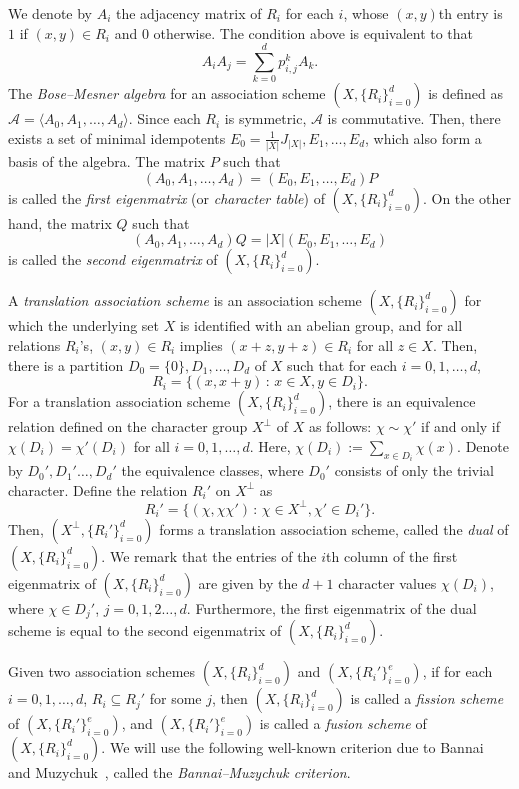 \documentclass[10pt]{amsart}
\theoremstyle{definition}
\begin{document}
We denote by $A_i$ the adjacency matrix of $R_i$ for each $i$, whose $(x,y)$th entry is $1$ if $(x,y)\in R_i$ and $0$ otherwise. The condition above is equivalent to that
\[
A_iA_j=\sum_{k=0}^d p_{i,j}^k A_k.
\]
The \emph{Bose--Mesner algebra} for an association scheme $(X,\{R_i\}_{i=0}^d)$ is defined as ${\mathcal A}=\langle A_0,A_1,\ldots,A_d\rangle$. Since each $R_i$ is symmetric, ${\mathcal A}$ is commutative. Then, there exists a set of minimal idempotents $E_0=\frac{1}{|X|}J_{|X|},E_1,\ldots,E_d$, which also form a basis of the algebra. The matrix $P$ such that
\[
(A_0,A_1,\ldots,A_d)=(E_0,E_1,\ldots,E_d)P
\]
is called the \emph{first eigenmatrix} (or \emph{character table}) of $(X,\{R_i\}_{i=0}^{d})$. On the other hand, the matrix $Q$ such that
\[
(A_0,A_1,\ldots,A_d)Q=|X|(E_0,E_1,\ldots,E_d)
\]
is called the \emph{second eigenmatrix} of $(X,\{R_i\}_{i=0}^{d})$.

A \emph{translation association scheme} is an association scheme $(X,\{R_i\}_{i=0}^{d})$ for which the underlying set $X$ is identified with an abelian group, and for all relations $R_i$'s, $(x,y)\in R_i$ implies $(x+z,y+z)\in R_i$ for all $z\in X$. Then, there is a partition $D_0=\{0\},D_1,\ldots,D_d$ of $X$ such that for each $i=0,1,\ldots,d$,
\[
R_i=\{(x,x+y)\,:\,x\in X,y\in D_i\}.
\]
For a translation association scheme $(X,\{R_i\}_{i=0}^{d})$, there is an equivalence relation defined on the character group $X^\perp$ of $X$ as follows: $\chi\sim \chi'$ if and only if $\chi(D_i)=\chi'(D_i)$ for all $i=0,1,\ldots,d$. Here, $\chi(D_i):=\sum_{x\in D_i}\chi(x)$. Denote by $D_0',D_1'\ldots,D_d'$ the equivalence classes, where $D_0'$ consists of only the trivial character. Define the relation $R_i'$ on $X^\perp$ as
\[
R_i'=\{(\chi,\chi \chi')\,:\,\chi \in X^\perp,\chi'\in D_i'\}.
\]
Then, $(X^\perp,\{R_i'\}_{i=0}^d)$ forms a translation association scheme, called the \emph{dual} of $(X,\{R_i\}_{i=0}^{d})$. We remark that the entries of the $i$th column of the first eigenmatrix of $(X,\{R_i\}_{i=0}^{d})$ are given by the $d+1$ character values $\chi(D_i)$, where $\chi\in D_j'$, $j=0,1,2\ldots,d$. Furthermore, the first eigenmatrix of the dual scheme is equal to the second eigenmatrix of $(X,\{R_i\}_{i=0}^{d})$.

Given two association schemes $(X,\{R_i\}_{i=0}^d)$ and $(X,\{R_i'\}_{i=0}^e)$, if for each $i=0,1,\ldots,d$, $R_i\subseteq R_j'$ for some $j$, then $(X,\{R_i\}_{i=0}^d)$ is called a \emph{fission scheme} of $(X,\{R_i'\}_{i=0}^e)$, and $(X,\{R_i'\}_{i=0}^e)$ is called a \emph{fusion scheme} of $(X,\{R_i\}_{i=0}^d)$. We will use the following well-known criterion due to Bannai~\cite{Ba} and Muzychuk~\cite{Mu}, called the \emph{Bannai--Muzychuk criterion}.
\end{document}
